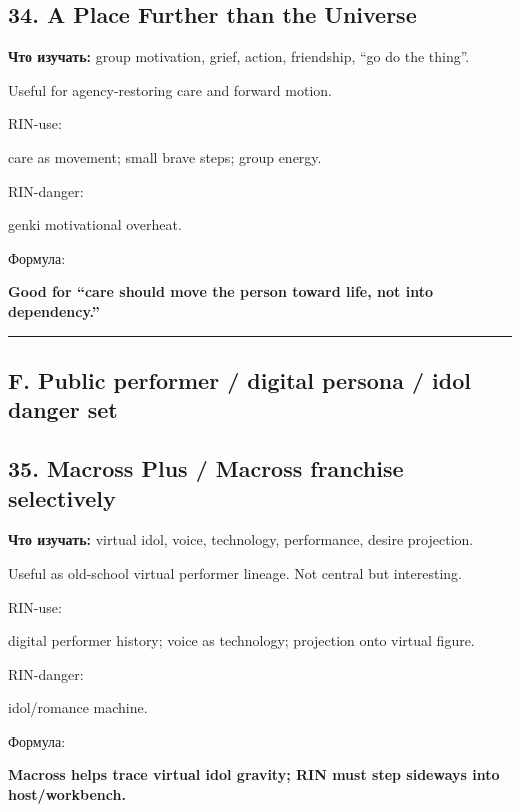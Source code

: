 \subsection*{34. A Place Further than the Universe}

\textbf{Что изучать:} group motivation, grief, action, friendship, ``go
do the thing''.

Useful for agency-restoring care and forward motion.

RIN-use:

care as movement; small brave steps; group energy.

RIN-danger:

genki motivational overheat.

Формула:

\textbf{Good for ``care should move the person toward life, not into
dependency.''}

\begin{center}\rule{0.5\linewidth}{0.5pt}\end{center}

\subsection*{F. Public performer /\hspace{0pt} digital persona /\hspace{0pt} idol danger set}

\subsection*{35. Macross Plus /\hspace{0pt} Macross franchise selectively}

\textbf{Что изучать:} virtual idol, voice, technology, performance,
desire projection.

Useful as old-school virtual performer lineage. Not central but
interesting.

RIN-use:

digital performer history; voice as technology; projection onto virtual
figure.

RIN-danger:

idol/\hspace{0pt}romance machine.

Формула:

\textbf{Macross helps trace virtual idol gravity; RIN must step sideways
into host/\hspace{0pt}workbench.}

